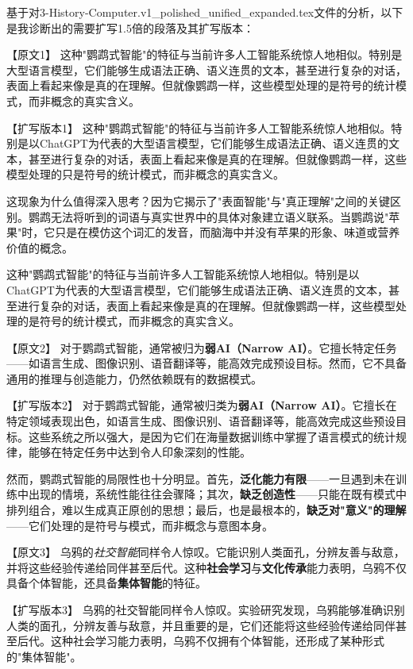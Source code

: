 基于对3-History-Computer.v1_polished_unified_expanded.tex文件的分析，以下是我诊断出的需要扩写1.5倍的段落及其扩写版本：

【原文1】
这种"鹦鹉式智能"的特征与当前许多人工智能系统惊人地相似。特别是大型语言模型，它们能够生成语法正确、语义连贯的文本，甚至进行复杂的对话，表面上看起来像是真的在理解。但就像鹦鹉一样，这些模型处理的是符号的统计模式，而非概念的真实含义。

【扩写版本1】
这种"鹦鹉式智能"的特征与当前许多人工智能系统惊人地相似。特别是以ChatGPT为代表的大型语言模型，它们能够生成语法正确、语义连贯的文本，甚至进行复杂的对话，表面上看起来像是真的在理解。但就像鹦鹉一样，这些模型处理的只是符号的统计模式，而非概念的真实含义。

这现象为什么值得深入思考？因为它揭示了"表面智能"与"真正理解"之间的关键区别。鹦鹉无法将听到的词语与真实世界中的具体对象建立语义联系。当鹦鹉说"苹果"时，它只是在模仿这个词汇的发音，而脑海中并没有苹果的形象、味道或营养价值的概念。

这种"鹦鹉式智能"的特征与当前许多人工智能系统惊人地相似。特别是以ChatGPT为代表的大型语言模型，它们能够生成语法正确、语义连贯的文本，甚至进行复杂的对话，表面上看起来像是真的在理解。但就像鹦鹉一样，这些模型处理的是符号的统计模式，而非概念的真实含义。

【原文2】
对于鹦鹉式智能，通常被归为\textbf{弱AI（Narrow AI）}。它擅长特定任务——如语言生成、图像识别、语音翻译等，能高效完成预设目标。然而，它不具备通用的推理与创造能力，仍然依赖既有的数据模式。

【扩写版本2】
对于鹦鹉式智能，通常被归类为\textbf{弱AI（Narrow AI）}。它擅长在特定领域表现出色，如语言生成、图像识别、语音翻译等，能高效完成这些预设目标。这些系统之所以强大，是因为它们在海量数据训练中掌握了语言模式的统计规律，能够在特定任务中达到令人印象深刻的性能。

然而，鹦鹉式智能的局限性也十分明显。首先，\textbf{泛化能力有限}——一旦遇到未在训练中出现的情境，系统性能往往会骤降；其次，\textbf{缺乏创造性}——只能在既有模式中排列组合，难以生成真正原创的思想；最后，也是最根本的，\textbf{缺乏对"意义"的理解}——它们处理的是符号与模式，而非概念与意图本身。

【原文3】
乌鸦的\emph{社交智能}同样令人惊叹。它能识别人类面孔，分辨友善与敌意，并将这些经验传递给同伴甚至后代。这种\textbf{社会学习}与\textbf{文化传承}能力表明，乌鸦不仅具备个体智能，还具备\textbf{集体智能}的特征。

【扩写版本3】
乌鸦的社交智能同样令人惊叹。实验研究发现，乌鸦能够准确识别人类的面孔，分辨友善与敌意，并且重要的是，它们还能将这些经验传递给同伴甚至后代。这种社会学习能力表明，乌鸦不仅拥有个体智能，还形成了某种形式的"集体智能"。

